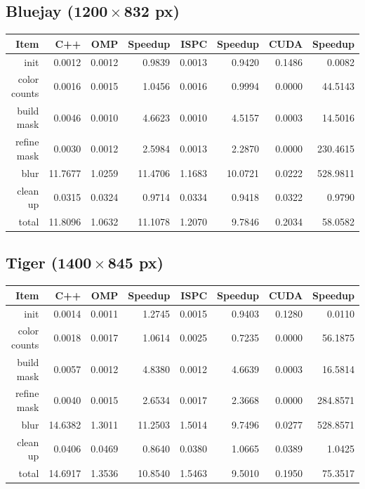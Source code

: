 \documentclass[12pt]{article}
\begin{document}
\subsection{Bluejay ($\mathbf{1200 \times 832}$ px)}

\begin{tabular}{r|r|r|r|r|r|r|r}
    Item & C++ & OMP & Speedup & ISPC & Speedup & CUDA & Speedup
\\  \hline
    init & 0.0012 & 0.0012 & 0.9839 & 0.0013 & 0.9420 & 0.1486 & 0.0082
\\  color counts & 0.0016 & 0.0015 & 1.0456 & 0.0016 & 0.9994 & 0.0000 & 44.5143
\\  build mask & 0.0046 & 0.0010 & 4.6623 & 0.0010 & 4.5157 & 0.0003 & 14.5016
\\  refine mask & 0.0030 & 0.0012 & 2.5984 & 0.0013 & 2.2870 & 0.0000 & 230.4615
\\  blur & 11.7677 & 1.0259 & 11.4706 & 1.1683 & 10.0721 & 0.0222 & 528.9811
\\  clean up & 0.0315 & 0.0324 & 0.9714 & 0.0334 & 0.9418 & 0.0322 & 0.9790
\\  \hline
    total & 11.8096 & 1.0632 & 11.1078 & 1.2070 & 9.7846 & 0.2034 & 58.0582
\end{tabular}

\subsection{Tiger ($\mathbf{1400 \times 845}$ px)}

\begin{tabular}{r|r|r|r|r|r|r|r}
    Item & C++ & OMP & Speedup & ISPC & Speedup & CUDA & Speedup
\\  \hline
    init & 0.0014 & 0.0011 & 1.2745 & 0.0015 & 0.9403 & 0.1280 & 0.0110
\\  color counts & 0.0018 & 0.0017 & 1.0614 & 0.0025 & 0.7235 & 0.0000 & 56.1875
\\  build mask & 0.0057 & 0.0012 & 4.8380 & 0.0012 & 4.6639 & 0.0003 & 16.5814
\\  refine mask & 0.0040 & 0.0015 & 2.6534 & 0.0017 & 2.3668 & 0.0000 & 284.8571
\\  blur & 14.6382 & 1.3011 & 11.2503 & 1.5014 & 9.7496 & 0.0277 & 528.8571
\\  clean up & 0.0406 & 0.0469 & 0.8640 & 0.0380 & 1.0665 & 0.0389 & 1.0425
\\  \hline
    total & 14.6917 & 1.3536 & 10.8540 & 1.5463 & 9.5010 & 0.1950 & 75.3517
\end{tabular}
\end{document}
